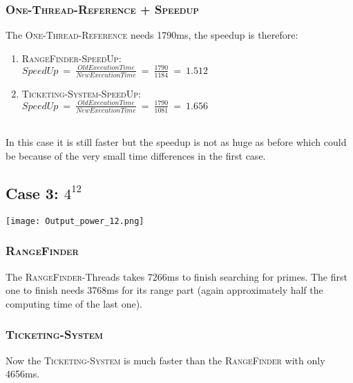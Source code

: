 \documentclass{article}
\begin{document}
\begin{adjustwidth}{2em}{2em}
\begin{adjustwidth}{2em}{2em}
			\subsubsection*{\textsc{One-Thread-Reference + Speedup}}
			\begin{adjustwidth}{1em}{}
				The \textsc{One-Thread-Reference} needs 1790ms, the speedup is therefore: \\
				\begin{enumerate}[]
					\item \textsc{RangeFinder-SpeedUp}: \\
					$\textit{SpeedUp} \ = \ \frac{\textit{OldExecutionTime}}{\textit{NewExecutionTime}} \ = \ \frac{1790}{1184} \ = \ 1.512$
					\item \textsc{Ticketing-System-SpeedUp}: \\
					$\textit{SpeedUp} \ = \ \frac{\textit{OldExecutionTime}}{\textit{NewExecutionTime}} \ = \ \frac{1790}{1081} \ = \ 1.656$
				\end{enumerate}
				\hfill \\
				In this case it is still faster but the speedup is not as huge as before which could be because of the very small time differences in the first case.
			\end{adjustwidth}
		\end{adjustwidth}
		
		\newpage
		
		\subsection*{Case 3: $4^{12}$}
		\begin{adjustwidth}{2em}{2em}
			\texttt{[image: Output\_power\_12.png]}
			\subsubsection*{\textsc{RangeFinder}}
			\begin{adjustwidth}{1em}{}
				The \textsc{RangeFinder}-Threads takes 7266ms to finish searching for primes. The first one to finish needs 3768ms for its range part (again approximately half the computing time of the last one).
			\end{adjustwidth}
			\subsubsection*{\textsc{Ticketing-System}}
			\begin{adjustwidth}{1em}{}
				Now the \textsc{Ticketing-System} is much faster than the \textsc{RangeFinder} with only 4656ms.
			\end{adjustwidth}

\end{adjustwidth}
\end{adjustwidth}
\end{document}
